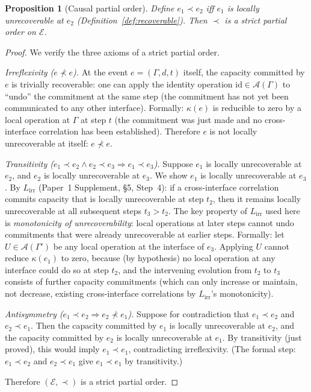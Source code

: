 \documentclass[11pt,a4paper]{article}
\newtheorem{proposition}[theorem]{Proposition}
\theoremstyle{definition}
\begin{document}
\begin{proposition}[Causal partial order]\label{prop:causal}
Define $e_1 \prec e_2$ iff $e_1$ is locally unrecoverable at $e_2$
(Definition~\ref{def:recoverable}).  Then $\prec$ is a strict partial
order on $\mathcal{E}$.
\end{proposition}

\begin{proof}
We verify the three axioms of a strict partial order.

\textit{Irreflexivity ($e \not\prec e$).}\quad
At the event $e = (\Gamma, d, t)$ itself, the capacity committed by
$e$ is trivially recoverable: one can apply the identity operation
$\mathrm{id} \in \mathcal{A}(\Gamma)$ to ``undo'' the commitment at
the same step (the commitment has not yet been communicated to any
other interface).  Formally: $\kappa(e)$ is reducible to zero by a
local operation at $\Gamma$ at step $t$ (the commitment was just
made and no cross-interface correlation has been established).
Therefore $e$ is not locally unrecoverable at itself: $e \not\prec e$.

\textit{Transitivity ($e_1 \prec e_2 \wedge e_2 \prec e_3 \Rightarrow
e_1 \prec e_3$).}\quad
Suppose $e_1$ is locally unrecoverable at $e_2$, and $e_2$ is locally
unrecoverable at $e_3$.  We show $e_1$ is locally unrecoverable at
$e_3$.  By $L_{\mathrm{irr}}$ (Paper~1 Supplement, \S5, Step~4):
if a cross-interface correlation commits capacity that is locally
unrecoverable at step $t_2$, then it remains locally unrecoverable
at all subsequent steps $t_3 > t_2$.  The key property of
$L_{\mathrm{irr}}$ used here is \emph{monotonicity of
unrecoverability}: local operations at later steps cannot undo
commitments that were already unrecoverable at earlier steps.
Formally: let $U \in \mathcal{A}(\Gamma')$ be any local operation
at the interface of $e_3$.  Applying $U$ cannot reduce
$\kappa(e_1)$ to zero, because (by hypothesis) no local operation
at any interface could do so at step $t_2$, and the intervening
evolution from $t_2$ to $t_3$ consists of further capacity
commitments (which can only increase or maintain, not decrease,
existing cross-interface correlations by $L_{\mathrm{irr}}$'s
monotonicity).

\textit{Antisymmetry ($e_1 \prec e_2 \Rightarrow e_2 \not\prec
e_1$).}\quad
Suppose for contradiction that $e_1 \prec e_2$ and $e_2 \prec e_1$.
Then the capacity committed by $e_1$ is locally unrecoverable at $e_2$,
and the capacity committed by $e_2$ is locally unrecoverable at $e_1$.
By transitivity (just proved), this would imply $e_1 \prec e_1$,
contradicting irreflexivity.  (The formal step: $e_1 \prec e_2$ and
$e_2 \prec e_1$ give $e_1 \prec e_1$ by transitivity.)

Therefore $(\mathcal{E}, \prec)$ is a strict partial order.
\end{proof}
\end{document}
